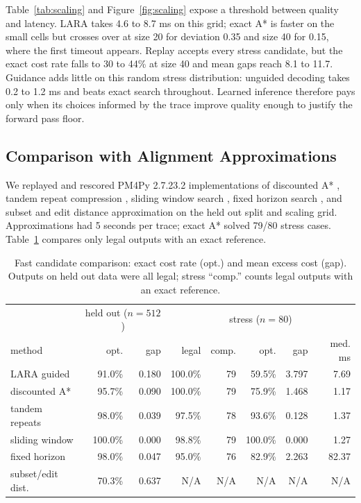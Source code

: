 \documentclass[manuscript,screen,nonacm]{acmart}
\begin{document}
Table~\ref{tab:scaling} and Figure~\ref{fig:scaling} expose a threshold between quality and latency. LARA takes 4.6 to 8.7 ms on this grid; exact A* is faster on the small cells but crosses over at size 20 for deviation 0.35 and size 40 for 0.15, where the first timeout appears. Replay accepts every stress candidate, but the exact cost rate falls to 30 to 44\% at size 40 and mean gaps reach 8.1 to 11.7. Guidance adds little on this random stress distribution: unguided decoding takes 0.2 to 1.2 ms and beats exact search throughout. Learned inference therefore pays only when its choices informed by the trace improve quality enough to justify the forward pass floor.

\subsection{Comparison with Alignment Approximations}
\label{sec:comparison}

We replayed and rescored PM4Py 2.7.23.2 implementations of discounted A* \cite{Boltenhagen2021}, tandem repeat compression \cite{ReissnerTandem2020}, sliding window search \cite{Bogdanov2024}, fixed horizon search \cite{Dongen2017}, and subset and edit distance approximation \cite{FaniSani2020} on the held out split and scaling grid. Approximations had 5 seconds per trace; exact A* solved 79/80 stress cases. Table~\ref{tab:approx} compares only legal outputs with an exact reference.

\begin{table}[t]
\centering
\caption{Fast candidate comparison: exact cost rate (opt.) and mean excess cost (gap). Outputs on held out data were all legal; stress ``comp.'' counts legal outputs with an exact reference.}
\label{tab:approx}
\scriptsize
\setlength{\tabcolsep}{3.2pt}
\begin{tabular}{@{}lrr|rrrrr@{}}
\toprule
& \multicolumn{2}{c|}{held out ($n=512$)} & \multicolumn{5}{c}{stress ($n=80$)} \\
method & opt. & gap & legal & comp. & opt. & gap & med. ms \\
\midrule
LARA guided       & 91.0\%  & 0.180 & 100.0\% & 79 & 59.5\%  & 3.797 & 7.69 \\
discounted A*     & 95.7\%  & 0.090 & 100.0\% & 79 & 75.9\%  & 1.468 & 1.17 \\
tandem repeats    & 98.0\%  & 0.039 &  97.5\% & 78 & 93.6\%  & 0.128 & 1.37 \\
sliding window    & 100.0\% & 0.000 &  98.8\% & 79 & 100.0\% & 0.000 & 1.27 \\
fixed horizon     & 98.0\%  & 0.047 &  95.0\% & 76 & 82.9\%  & 2.263 & 82.37 \\
subset/edit dist. & 70.3\%  & 0.637 & N/A & N/A & N/A & N/A & N/A \\
\bottomrule
\end{tabular}
\end{table}
\end{document}
